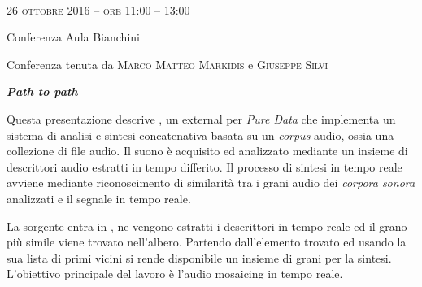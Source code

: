 
\begin{flushleft}

~\vfill

\large{
	\scshape{
	26 ottobre 2016 -- ore 11:00 -- 13:00
	}}

\medskip
	
\small{Conferenza
	\newline Aula Bianchini}

\medskip

{\fontsize{42}{42} }

\normalfont

\normalsize

\bigskip

Conferenza tenuta da \textsc{Marco Matteo Markidis} e \textsc{Giuseppe Silvi}

\bigskip

\textbf{\emph{Path to path~}}

Questa presentazione descrive \pa, %
un external per \emph{Pure Data} che implementa un sistema di analisi e sintesi concatenativa basata su un \emph{corpus} audio, ossia una collezione di file audio. %
Il suono \`e acquisito %
ed analizzato mediante un insieme di descrittori audio estratti in tempo differito. Il processo di sintesi in tempo reale avviene mediante riconoscimento di similarit\`a tra i grani audio dei \emph{corpora sonora} analizzati e il segnale in tempo reale.


La sorgente entra in \pa, ne vengono estratti i descrittori in tempo reale ed il grano pi\`u simile viene trovato nell'albero. Partendo dall'elemento trovato ed usando la sua lista di primi vicini si rende disponibile un insieme di grani per la sintesi. L'obiettivo principale del lavoro \`e l'audio mosaicing in tempo reale. 


\end{flushleft}
